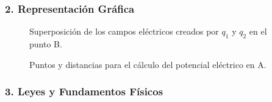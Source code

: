 \subsubsection*{2. Representación Gráfica}
\begin{figure}[H]
    \centering
    \caption{Superposición de los campos eléctricos creados por $q_1$ y $q_2$ en el punto B.}
\end{figure}
\begin{figure}[H]
    \centering
    \caption{Puntos y distancias para el cálculo del potencial eléctrico en A.}
\end{figure}

\subsubsection*{3. Leyes y Fundamentos Físicos}
